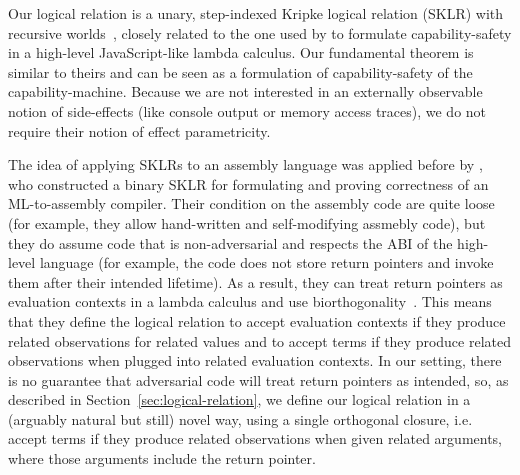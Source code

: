\documentclass[compsoc,conference,letterpaper,fleqn]{IEEEtran}
\begin{document}
Our logical relation is a unary, step-indexed Kripke logical relation (SKLR)
with recursive
worlds~\cite{Appel:2001:IMR:504709.504712,Ahmed2004semantics,Birkedal:2011:SKM:1926385.1926401},
closely related to the one used by \citet{Devriese:2016ObjCap} to formulate
capability-safety in a high-level JavaScript-like lambda calculus. Our
fundamental theorem is similar to theirs and can be seen as a formulation of
capability-safety of the capability-machine. Because we are not interested in an
externally observable notion of side-effects (like console output or memory
access traces), we do not require their notion of effect parametricity.

The idea of applying SKLRs to an assembly language was applied before by
\citet{Hur:2011:KLR:1926385.1926402}, who constructed a binary SKLR for
formulating and proving correctness of an ML-to-assembly compiler. Their
condition on the assembly code are quite loose (for example, they allow
hand-written and self-modifying assmebly code), but they do assume code that
is non-adversarial and respects the ABI of the high-level language (for example,
the code does not store return pointers and invoke them after their intended
lifetime). As a result, they can treat return pointers as evaluation contexts in
a lambda calculus and use biorthogonality~\cite{pitts_operational_1998}. This
means that they define the logical relation to accept evaluation contexts if
they produce related observations for related values and to accept terms if they
produce related observations when plugged into related evaluation contexts. In
our setting, there is no guarantee that adversarial code will treat return
pointers as intended, so, as described in Section~\ref{sec:logical-relation}, we
define our logical relation in a (arguably natural but still) novel way, using a single
orthogonal closure, i.e. accept terms if they produce related observations when
given related arguments, where those arguments include the return pointer.
\end{document}
